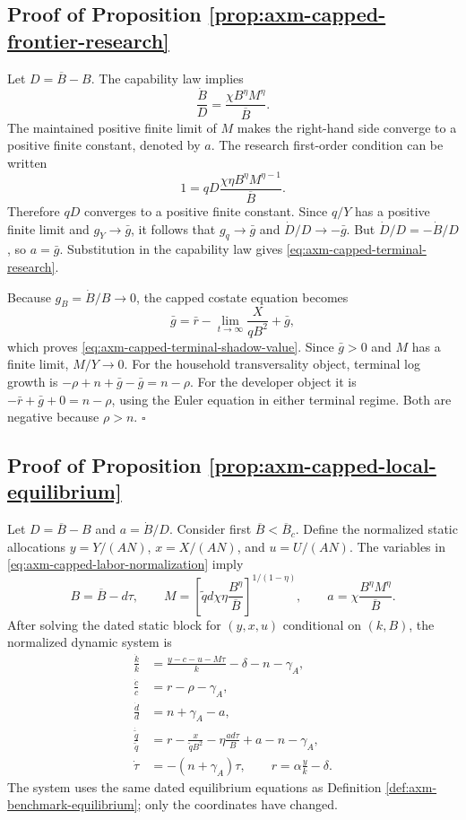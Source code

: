 \subsection{Proof of Proposition \ref{prop:axm-capped-frontier-research}}

Let \(D=\overline B-B\). The capability law implies
\[
 \frac{\dot B}{D}=\frac{\chi B^\eta M^\eta}{\overline B}.
\]
The maintained positive finite limit of \(M\) makes the right-hand side
converge to a positive finite constant, denoted by \(a\). The research
first-order condition can be written
\[
 1=qD\frac{\chi\eta B^\eta M^{\eta-1}}{\overline B}.
\]
Therefore \(qD\) converges to a positive finite constant. Since \(q/Y\) has
a positive finite limit and \(g_Y\to\bar g\), it follows that
\(g_q\to\bar g\) and \(\dot D/D\to-\bar g\). But
\(\dot D/D=-\dot B/D\), so \(a=\bar g\). Substitution in the capability law
gives \eqref{eq:axm-capped-terminal-research}.

Because \(g_B=\dot B/B\to0\), the capped costate equation becomes
\[
 \bar g=\bar r-\lim_{t\to\infty}\frac{X}{qB^2}+\bar g,
\]
which proves \eqref{eq:axm-capped-terminal-shadow-value}. Since
\(\bar g>0\) and \(M\) has a finite limit, \(M/Y\to0\). For the household
transversality object, terminal log growth is
\(-\rho+n+\bar g-\bar g=n-\rho\). For the developer object it is
\(-\bar r+\bar g+0=n-\rho\), using the Euler equation in either terminal
regime. Both are negative because \(\rho>n\). \(\square\)

\subsection{Proof of Proposition \ref{prop:axm-capped-local-equilibrium}}

Let \(D=\overline B-B\) and
\(a=\dot B/D\). Consider first
\(\overline B<\overline B_c\). Define the normalized static allocations
\(y=Y/(AN)\), \(x=X/(AN)\), and \(u=U/(AN)\). The variables in
\eqref{eq:axm-capped-labor-normalization} imply
\[
 B=\overline B-d\tau,
 \qquad
 M=\left[
  \widetilde qd\chi\eta\frac{B^\eta}{\overline B}
 \right]^{1/(1-\eta)},
 \qquad
 a=\chi\frac{B^\eta M^\eta}{\overline B}.
\]
After solving the dated static block for \((y,x,u)\) conditional on
\((k,B)\), the normalized dynamic system is
\begin{subequations}
\label{eq:axm-capped-labor-normalized-system}
\begin{align}
 \frac{\dot k}{k}
 &=\frac{y-c-u-M\tau}{k}-\delta-n-\gamma_A,\\
 \frac{\dot c}{c}&=r-\rho-\gamma_A,\\
 \frac{\dot d}{d}&=n+\gamma_A-a,\\
 \frac{\dot{\widetilde q}}{\widetilde q}
 &=r-\frac{x}{\widetilde qB^2}
 -\eta\frac{ad\tau}{B}+a-n-\gamma_A,\\
 \dot\tau&=-(n+\gamma_A)\tau,
 \qquad r=\alpha\frac{y}{k}-\delta.
\end{align}
\end{subequations}
The system uses the same dated equilibrium equations as Definition
\ref{def:axm-benchmark-equilibrium}; only the coordinates have changed.


